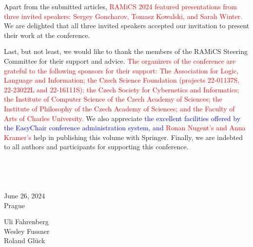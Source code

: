 \documentclass{llncs}
\newcommand{\red}[1]{\textcolor{red}{#1}}
\newcommand{\blue}[1]{\textcolor{blue}{#1}}
\begin{document}
Apart from the submitted articles, \red{RAMiCS 2024 featured presentations from 
three invited speakers: Sergey Goncharov, Tomasz Kowalski, and Sarah Winter.} 
We are delighted that all three invited speakers accepted our invitation to 
present their work at the conference.

Last, but not least, we would like to thank the members of the RAMiCS
Steering Committee for their support and advice. \red{The organizers of the conference are grateful to the following sponsors for their support: The Association for Logic, Language and Information; the Czech Science Foundation (projects 22-01137S, 22-23022L and 22-16111S); the Czech Society for Cybernetics and Informatics; the Institute of Computer Science of the Czech Academy of Sciences; the Institute of Philosophy of the Czech Academy of Sciences; and the Faculty of Arts of Charles University.}
We also appreciate \blue{the excellent facilities offered by the EasyChair
conference administration system, and} \red{Ronan Nugent's and Anna
  Kramer's} help in publishing this volume with Springer. Finally, we
are indebted to all authors and participants for supporting this
conference.

 



~\bigskip


\noindent
\begin{minipage}[t]{.4\textwidth}
June 26, 2024\\
Prague
\end{minipage}%
\hfill
\begin{minipage}[t]{.4\textwidth}\flushright
  Uli Fahrenberg \\
  Wesley Fussner \\
  Roland Gl\"uck
\end{minipage}
\end{document}
